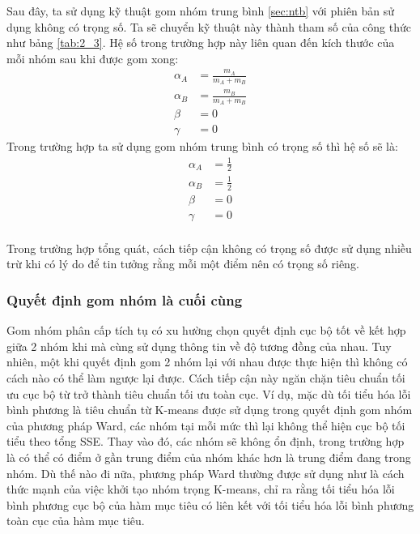Sau đây, ta sử dụng kỹ thuật gom nhóm trung bình \ref{sec:ntb} với phiên bản sử dụng không có trọng số.
Ta sẽ chuyển kỹ thuật này thành tham số của công thức như bảng \ref{tab:2_3}.
Hệ số trong trường hợp này liên quan đến kích thước của mỗi nhóm sau khi được gom xong:
\begin{equation}
\begin{aligned}
\alpha_A &= \frac{m_A}{m_A + m_B}	\\
\alpha_B &= \frac{m_B}{m_A + m_B}	\\
\beta &= 0		\\
\gamma &= 0
\end{aligned}
\end{equation}
Trong trường hợp ta sử dụng gom nhóm trung bình có trọng số thì hệ số sẽ là:
\begin{equation}
\begin{aligned}
\alpha_A &= \frac{1}{2} \\
\alpha_B &= \frac{1}{2} \\
\beta &= 0		\\
\gamma &= 0		\\
\end{aligned}
\end{equation}

Trong trường hợp tổng quát, cách tiếp cận không có trọng số được sử dụng nhiều trừ khi có lý do để tin tưởng rằng mỗi một điểm nên có trọng số riêng.

\subsubsection{Quyết định gom nhóm là cuối cùng}
Gom nhóm phân cấp tích tụ có xu hường chọn quyết định cục bộ tốt về kết hợp giữa 2 nhóm khi mà cùng sử dụng thông tin về độ tương đồng của nhau.
Tuy nhiên, một khi quyết định gom 2 nhóm lại với nhau được thực hiện thì không có cách nào có thể làm ngược lại được.
Cách tiếp cận này ngăn chặn tiêu chuẩn tối ưu cục bộ từ trở thành tiêu chuẩn tối ưu toàn cục.
Ví dụ, mặc dù tối tiểu hóa lỗi bình phương là tiêu chuẩn từ K-means được sử dụng trong quyết định gom nhóm của phương pháp Ward, các nhóm tại mỗi mức thì lại không thể hiện cục bộ tối tiểu theo tổng SSE.
Thay vào đó, các nhóm sẽ không ổn định, trong trường hợp là có thể có điểm ở gần trung điểm của nhóm khác hơn là trung điểm đang trong nhóm.
Dù thế nào đi nữa, phương pháp Ward thường được sử dụng như là cách thức mạnh của việc khởi tạo nhóm trọng K-means, chỉ ra rằng tối tiểu hóa lỗi bình phương cục bộ của hàm mục tiêu có liên kết với tối tiểu hóa lỗi bình phương toàn cục của hàm mục tiêu.

